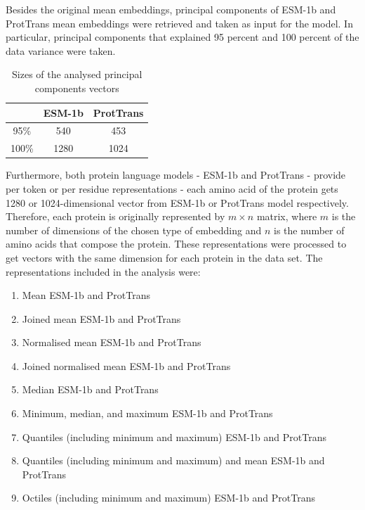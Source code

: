 \documentclass[12pt]{article}
\begin{document}
	Besides the original mean embeddings, principal components 
	of ESM-1b and ProtTrans
	mean embeddings were retrieved and taken as input for the 
	model. In particular, principal components that explained 
	95 percent and 100 percent of the data variance were taken.

	\begin{table}[h!]
		\caption{Sizes of the analysed principal components 
		vectors}
		\vspace{0.2cm}
		\centering
		\begin{tabular}{ | c | c c | }
			\hline 
			 & ESM-1b & ProtTrans \\
			\hline 
			95\% & 540 & 453 \\
			100\% & 1280 & 1024 \\
			\hline    
		\end{tabular}
		\label{table:vectorsPCADimensions}
	\end{table}
	
	Furthermore, both protein language models - ESM-1b and 
	ProtTrans - provide 
	per token or per residue representations - each 
	amino acid of the protein gets 1280 or 1024-dimensional vector from
	ESM-1b or ProtTrans model respectively. Therefore, each protein is 
	originally represented by ${m \times n}$ matrix, 
	where ${m}$ is the number of dimensions of the chosen type of embedding
	and ${n}$ is the number of amino acids that compose the protein. 
	These representations were processed to get vectors with the same dimension 
	for each protein in the data set. The representations 
	included in the analysis were:

	\begin{enumerate}
		\item Mean ESM-1b and ProtTrans 
		\item Joined mean ESM-1b and ProtTrans
		\item Normalised mean ESM-1b and ProtTrans
		\item Joined normalised mean ESM-1b and ProtTrans
		\item Median ESM-1b and ProtTrans
		\item Minimum, median, and maximum ESM-1b and ProtTrans
		\item Quantiles (including minimum and maximum) ESM-1b and ProtTrans
		\item Quantiles (including minimum and maximum) and mean ESM-1b and ProtTrans
		\item Octiles (including minimum and maximum) ESM-1b and ProtTrans
	\end{enumerate}
\end{document}
